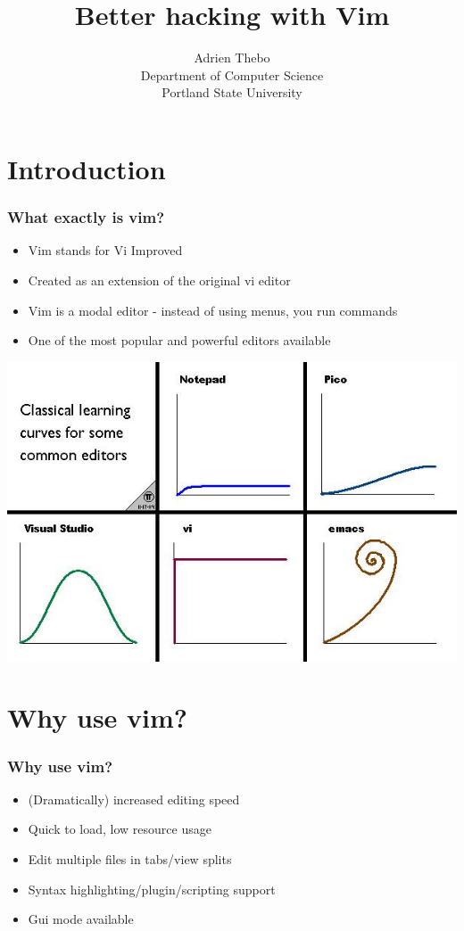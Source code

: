\documentclass{beamer}
\title{Better hacking with Vim}
\author{Adrien Thebo \\
    Department of Computer Science \\
    Portland State University
}
\begin{document}
\begin{frame}
    \titlepage
\end{frame}

\section{Introduction}

\begin{frame}
    \frametitle{What exactly is vim?}
    \begin{itemize}
	\item Vim stands for Vi Improved
	\item Created as an extension of the original vi editor
	\item Vim is a modal editor - instead of using menus, you run commands
	\item One of the most popular and powerful editors available
    \end{itemize}
\end{frame}

\begin{frame}
    \includegraphics[scale = .7]{curves.jpg}
\end{frame}

\section{Why use vim?}

\begin{frame}
    \frametitle{Why use vim?}
    \begin{itemize}
	\item (Dramatically) increased editing speed
	\item Quick to load, low resource usage
	\item Edit multiple files in tabs/view splits 
	\item Syntax highlighting/plugin/scripting support
	\item Gui mode available
    \end{itemize}
\end{frame}
\end{document}
